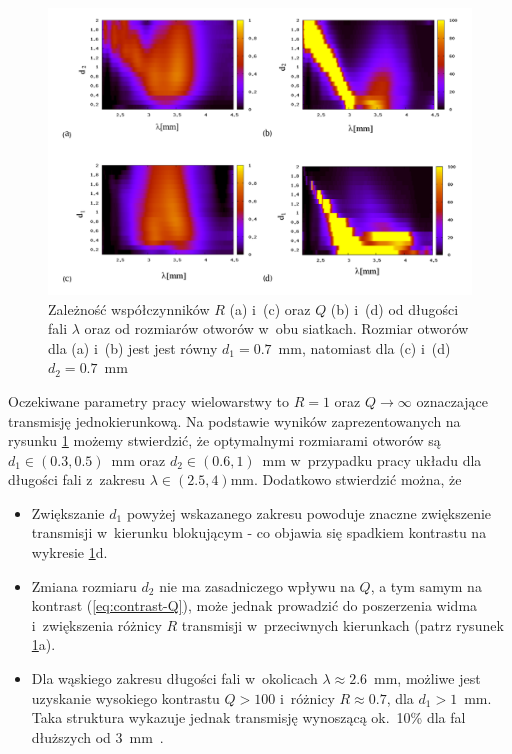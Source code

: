 \begin{figure}[tb]
	\includegraphics[width=\textwidth]{images/dmg/kontrast_maps.png}
	\caption{Zależność współczynników $R$ (a) i~(c) oraz $Q$ (b) i~(d) od długości fali $\lambda$ oraz od rozmiarów otworów w~obu siatkach. Rozmiar otworów dla (a) i~(b) jest   jest równy $d_1=0.7$~mm, natomiast dla (c) i~(d) $d_2=0.7$~mm }
	\label{fig:qr-od-d}
\end{figure}

Oczekiwane parametry pracy wielowarstwy to $R=1$ oraz $Q \to \infty$ oznaczające transmisję jednokierunkową. Na podstawie wyników zaprezentowanych na rysunku \ref{fig:qr-od-d} możemy stwierdzić, że optymalnymi rozmiarami otworów są $d_1\in(0.3,0.5)$~mm oraz $d_2\in(0.6,1)$~mm w~przypadku pracy układu dla długości fali z~zakresu $\lambda \in (2.5, 4)$mm. Dodatkowo stwierdzić można, że
\begin{itemize}
	\item Zwiększanie $d_1$ powyżej wskazanego zakresu powoduje znaczne zwiększenie transmisji w~kierunku blokującym - co objawia się spadkiem kontrastu na wykresie \ref{fig:qr-od-d}d.
	\item Zmiana rozmiaru $d_2$ nie ma zasadniczego wpływu na $Q$, a tym samym na kontrast (\ref{eq:contrast-Q}), może jednak prowadzić do poszerzenia widma i~zwiększenia różnicy $R$ transmisji w~przeciwnych kierunkach (patrz rysunek \ref{fig:qr-od-d}a).
	\item Dla wąskiego zakresu długości fali w~okolicach $\lambda\approx2.6$~mm, możliwe jest uzyskanie wysokiego kontrastu $Q>100$ i~różnicy ${R\approx 0.7}$, dla ${d_1>1}$~mm. Taka struktura wykazuje jednak transmisję wynoszącą ok.~10\% dla fal dłuższych od $3$~mm~\cite{stolarek2013broadband}.
\end{itemize}
